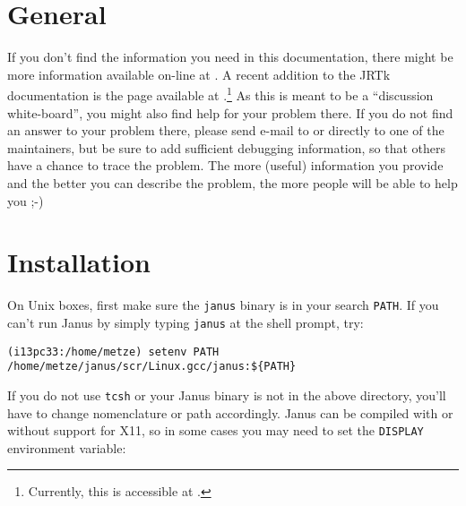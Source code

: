 \section{General} \label{trouble:general}

If  you don't  find the  information  you need in this  documentation,
there might       be  more    information   available      on-line  at
. A
recent addition to the  JRTk  documentation is the   page
available                                                           at
.\footnote{Currently,
this                  is                       accessible           at
.} 
As  this is meant to be  a ``discussion  white-board'', you might also
find help for your problem there. If you do not find an answer to your
problem    there,           please         send     e-mail          to
or directly  to one of the maintainers,  but be sure to add sufficient
debugging  information, so  that others have  a  chance  to trace  the
problem. The more (useful) information  you provide and the better you
can describe the problem, the more people will be able to help you ;-)


\section{Installation} \label{trouble:installation}

On Unix boxes,  first make sure the \texttt{janus}  binary is in  your
search  \texttt{PATH}.  If   you can't   run Janus  by   simply typing
\texttt{janus} at the shell prompt, try:

\begin{verbatim}
(i13pc33:/home/metze) setenv PATH /home/metze/janus/scr/Linux.gcc/janus:${PATH}
\end{verbatim}

If you do  not use \texttt{tcsh} or  your  Janus binary is not  in the
above  directory,  you'll have    to    change nomenclature   or  path
accordingly. Janus can be compiled with or without support for X11, so
in some  cases you may  need to  set the  \texttt{DISPLAY} environment
variable:

